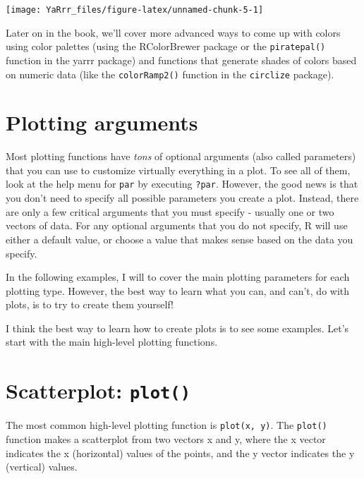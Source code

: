 \documentclass[]{book}
\theoremstyle{definition}
\theoremstyle{definition}
\theoremstyle{remark}
\begin{document}
\begin{center}\texttt{[image: YaRrr\_files/figure-latex/unnamed-chunk-5-1]} \end{center}

Later on in the book, we'll cover more advanced ways to come up with
colors using color palettes (using the RColorBrewer package or the
\texttt{piratepal()} function in the yarrr package) and functions that
generate shades of colors based on numeric data (like the
\texttt{colorRamp2()} function in the \texttt{circlize} package).

\section{Plotting arguments}\label{plotting-arguments}

Most plotting functions have \emph{tons} of optional arguments (also
called parameters) that you can use to customize virtually everything in
a plot. To see all of them, look at the help menu for \texttt{par} by
executing \texttt{?par}. However, the good news is that you don't need
to specify all possible parameters you create a plot. Instead, there are
only a few critical arguments that you must specify - usually one or two
vectors of data. For any optional arguments that you do not specify, R
will use either a default value, or choose a value that makes sense
based on the data you specify.

In the following examples, I will to cover the main plotting parameters
for each plotting type. However, the best way to learn what you can, and
can't, do with plots, is to try to create them yourself!

I think the best way to learn how to create plots is to see some
examples. Let's start with the main high-level plotting functions.

\section{\texorpdfstring{Scatterplot:
\texttt{plot()}}{Scatterplot: plot()}}\label{scatterplot-plot}

The most common high-level plotting function is \texttt{plot(x,\ y)}.
The \texttt{plot()} function makes a scatterplot from two vectors x and
y, where the x vector indicates the x (horizontal) values of the points,
and the y vector indicates the y (vertical) values.
\end{document}
